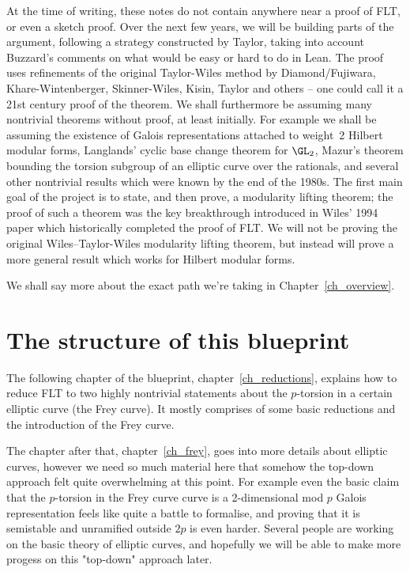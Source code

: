 At the time of writing, these notes do not contain anywhere near a proof of FLT, or even a sketch proof.
Over the next few years, we will be building parts of the argument, following a strategy
constructed by Taylor, taking into account Buzzard's comments on what would be easy or hard to do
in Lean. The proof uses refinements of the original Taylor-Wiles method by Diamond/Fujiwara,
Khare-Wintenberger, Skinner-Wiles, Kisin, Taylor and others -- one could call it a 21st century
proof of the theorem. We shall furthermore be assuming many nontrivial theorems without proof,
at least initially. For example we shall be assuming the existence of Galois representations
attached to weight~2 Hilbert modular forms, Langlands' cyclic base change theorem for $\GL_2$,
Mazur's theorem bounding the torsion subgroup of an elliptic curve over the rationals, and
several other nontrivial results which were known by the end of the 1980s. The first main goal
of the project is to state, and then prove, a modularity lifting theorem; the proof of such a theorem
was the key breakthrough introduced in Wiles' 1994 paper which historically completed the proof
of FLT. We will not be proving the original Wiles--Taylor-Wiles modularity lifting theorem, but
instead will prove a more general result which works for Hilbert modular forms.

We shall say more about the exact path we're taking in
Chapter~\ref{ch_overview}.

\section{The structure of this blueprint}

The following chapter of the blueprint, chapter~\ref{ch_reductions}, explains how to reduce FLT
to two highly nontrivial statements about the $p$-torsion in a certain elliptic curve (the Frey curve).
It mostly comprises of some basic reductions and the introduction of the Frey curve.

The chapter after that, chapter~\ref{ch_frey}, goes into more details about elliptic curves,
however we need so much material here that somehow the top-down approach felt quite overwhelming
at this point. For example even the basic claim that the $p$-torsion in the Frey curve curve is
a 2-dimensional mod $p$ Galois representation feels like quite a battle to formalise,
and proving that it is semistable and unramified outside $2p$ is even harder.
Several people are working on the basic theory of elliptic curves, and hopefully
we will be able to make more progess on this "top-down" approach later.


